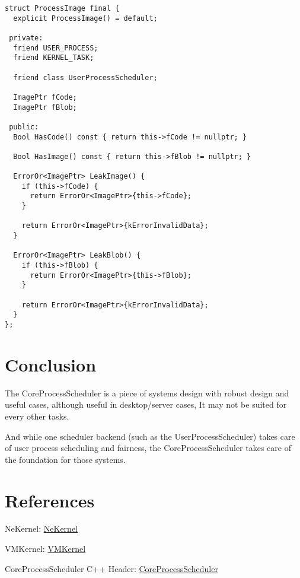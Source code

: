 \documentclass{article}
\begin{document}
\begin{verbatim}
struct ProcessImage final {
  explicit ProcessImage() = default;

 private:
  friend USER_PROCESS;
  friend KERNEL_TASK;

  friend class UserProcessScheduler;

  ImagePtr fCode;
  ImagePtr fBlob;

 public:
  Bool HasCode() const { return this->fCode != nullptr; }

  Bool HasImage() const { return this->fBlob != nullptr; }

  ErrorOr<ImagePtr> LeakImage() {
    if (this->fCode) {
      return ErrorOr<ImagePtr>{this->fCode};
    }

    return ErrorOr<ImagePtr>{kErrorInvalidData};
  }

  ErrorOr<ImagePtr> LeakBlob() {
    if (this->fBlob) {
      return ErrorOr<ImagePtr>{this->fBlob};
    }

    return ErrorOr<ImagePtr>{kErrorInvalidData};
  }
};

\end{verbatim}

\section{Conclusion}

{The CoreProcessScheduler is a piece of systems design with robust design and useful cases, although useful in desktop/server cases, It may not be suited for every other tasks.}

{And while one scheduler backend (such as the UserProcessScheduler) takes care of user process scheduling and fairness, the CoreProcessScheduler takes care of the foundation for those systems.}

\section{References}

{NeKernel}: \href{https://github.com/nekernel-org/nekernel}{NeKernel}

{VMKernel}: \href{https://snu.systems/specs/vmkernel}{VMKernel}

{CoreProcessScheduler C++ Header}: \href{https://github.com/nekernel-org/nekernel/blob/dev/dev/kernel/KernelKit/CoreProcessScheduler.h}{CoreProcessScheduler}
\end{document}
